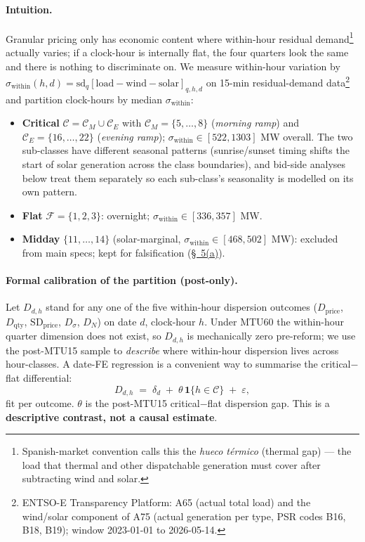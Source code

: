 \documentclass[11pt]{article}
\begin{document}
\paragraph{Intuition.} Granular pricing only has economic content where within-hour residual demand\footnote{Spanish-market convention calls this the \emph{hueco t\'ermico} (thermal gap) --- the load that thermal and other dispatchable generation must cover after subtracting wind and solar.} actually varies; if a clock-hour is internally flat, the four quarters look the same and there is nothing to discriminate on. We measure within-hour variation by $\sigma_{\text{within}}(h,d) = \mathrm{sd}_q[\text{load}-\text{wind}-\text{solar}]_{q,h,d}$ on 15-min residual-demand data\footnote{ENTSO-E Transparency Platform: A65 (actual total load) and the wind/solar component of A75 (actual generation per type, PSR codes B16, B18, B19); window 2023-01-01 to 2026-05-14.} and partition clock-hours by median $\sigma_{\text{within}}$:
\begin{itemize}\setlength{\itemsep}{1pt}
\item \textbf{Critical} $\mathcal{C}=\mathcal{C}_M\cup\mathcal{C}_E$ with $\mathcal{C}_M=\{5,\dots,8\}$ (\emph{morning ramp}) and $\mathcal{C}_E=\{16,\dots,22\}$ (\emph{evening ramp}); $\sigma_{\text{within}}\in[522,1303]$ MW overall. The two sub-classes have different seasonal patterns (sunrise/sunset timing shifts the start of solar generation across the class boundaries), and bid-side analyses below treat them separately so each sub-class's seasonality is modelled on its own pattern.
\item \textbf{Flat} $\mathcal{F}=\{1,2,3\}$: overnight; $\sigma_{\text{within}}\in[336,357]$ MW.
\item \textbf{Midday} $\{11,\dots,14\}$ (solar-marginal, $\sigma_{\text{within}}\in[468,502]$ MW): excluded from main specs; kept for falsification (\hyperref[sec:5a]{\S~5(a)}).
\end{itemize}

\paragraph{Formal calibration of the partition (post-only).} Let $D_{d,h}$ stand for any one of the five within-hour dispersion outcomes ($D_{\text{price}}$, $D_{\text{qty}}$, $\text{SD}_{\text{price}}$, $D_\sigma$, $D_N$) on date $d$, clock-hour $h$. Under MTU60 the within-hour quarter dimension does not exist, so $D_{d,h}$ is mechanically zero pre-reform; we use the post-MTU15 sample to \emph{describe} where within-hour dispersion lives across hour-classes. A date-FE regression is a convenient way to summarise the critical$-$flat differential:
\[
D_{d,h} \;=\; \delta_d \;+\; \theta\,\mathbf{1}\{h\in\mathcal{C}\} \;+\; \varepsilon,
\]
fit per outcome. $\theta$ is the post-MTU15 critical$-$flat dispersion gap. This is a \textbf{descriptive contrast, not a causal estimate}.
\end{document}
